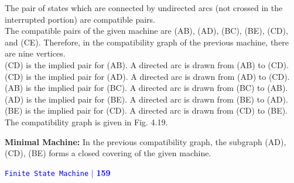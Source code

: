 \documentclass[a4]{article}
\begin{document}
\hspace*{0.2cm} The pair of states which are connected by undirected
arcs (not crossed in the interrupted portion) are compatible
pairs.\\

\hspace*{0.2cm} The compatible pairs of the given machine are (AB),
(AD), (BC), (BE), (CD), and (CE). Therefore, in the
compatibility graph of the previous machine, there are
nine vertices.\\

\hspace*{0.2cm} (CD) is the implied pair for (AB). A directed arc is
drawn from (AB) to (CD).\\

\hspace*{0.2cm} (CD) is the implied pair for (AD). A directed arc is
drawn from (AD) to (CD).\\

\hspace*{0.2cm} (AB) is the implied pair for (BC). A directed arc is
drawn from (BC) to (AB).\\

\hspace*{0.2cm} (AD) is the implied pair for (BE). A directed arc is
drawn from (BE) to (AD).\\

(BE) is the implied pair for (CD). A directed arc is
drawn from (CD) to (BE).\\

\hspace*{0.2cm} The compatibility graph is given in Fig. 4.19.\\

\vspace*{0.2cm}

\textbf{Minimal Machine:} In the previous compatibility graph, the subgraph (AD), (CD), (BE) forms a closed
covering of the given machine.

\newpage
\begin{flushright}
 \textcolor{blue}{\hspace*{0.5cm} \texttt{Finite State Machine} \hspace*{0.10cm}\textbf{$|$} \textbf{159}\hspace*{0.5cm}}
\end{flushright}
\end{document}
